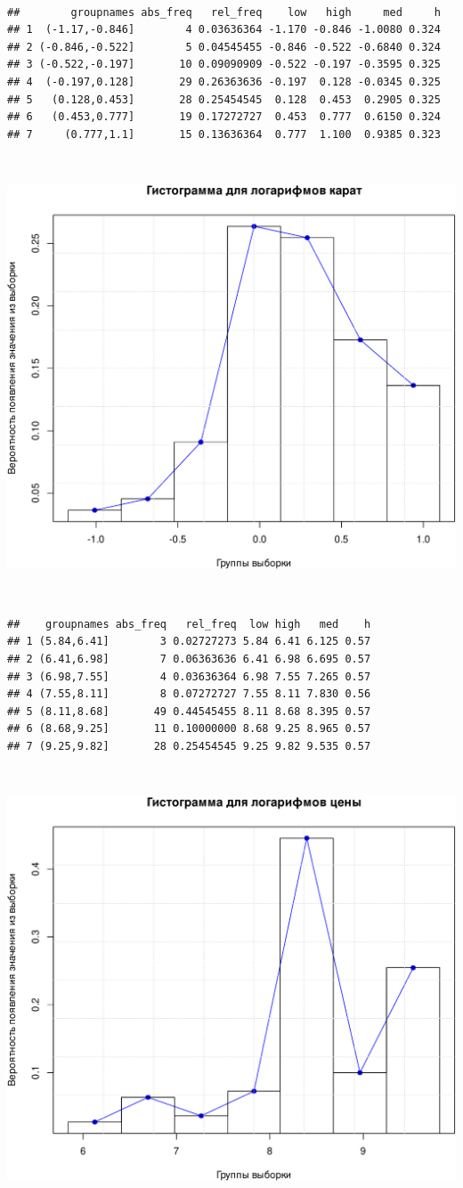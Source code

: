 \documentclass[
]{article}
\begin{document}
\(\ \)

\begin{verbatim}
##        groupnames abs_freq   rel_freq    low   high     med     h
## 1  (-1.17,-0.846]        4 0.03636364 -1.170 -0.846 -1.0080 0.324
## 2 (-0.846,-0.522]        5 0.04545455 -0.846 -0.522 -0.6840 0.324
## 3 (-0.522,-0.197]       10 0.09090909 -0.522 -0.197 -0.3595 0.325
## 4  (-0.197,0.128]       29 0.26363636 -0.197  0.128 -0.0345 0.325
## 5   (0.128,0.453]       28 0.25454545  0.128  0.453  0.2905 0.325
## 6   (0.453,0.777]       19 0.17272727  0.453  0.777  0.6150 0.324
## 7     (0.777,1.1]       15 0.13636364  0.777  1.100  0.9385 0.323
\end{verbatim}

\(\ \)

\begin{center}\includegraphics[width=0.6\linewidth]{Prac5_files/figure-latex/unnamed-chunk-6-1} \end{center}

\(\ \)

\begin{verbatim}
##    groupnames abs_freq   rel_freq  low high   med    h
## 1 (5.84,6.41]        3 0.02727273 5.84 6.41 6.125 0.57
## 2 (6.41,6.98]        7 0.06363636 6.41 6.98 6.695 0.57
## 3 (6.98,7.55]        4 0.03636364 6.98 7.55 7.265 0.57
## 4 (7.55,8.11]        8 0.07272727 7.55 8.11 7.830 0.56
## 5 (8.11,8.68]       49 0.44545455 8.11 8.68 8.395 0.57
## 6 (8.68,9.25]       11 0.10000000 8.68 9.25 8.965 0.57
## 7 (9.25,9.82]       28 0.25454545 9.25 9.82 9.535 0.57
\end{verbatim}

\(\ \)

\begin{center}\includegraphics[width=0.6\linewidth]{Prac5_files/figure-latex/unnamed-chunk-8-1} \end{center}
\end{document}
